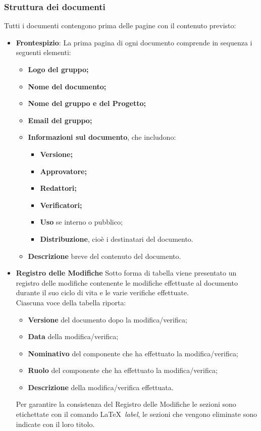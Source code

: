 \subsubsection{Struttura dei documenti}\label{StrutturaDocumenti}
Tutti i documenti contengono prima delle pagine con il contenuto previsto:
\begin{itemize}
\item \textbf{Frontespizio}:
La prima pagina di ogni documento comprende in sequenza i seguenti elementi:
\begin{itemize}
	\item \textbf{Logo del gruppo; }
	\item \textbf{Nome del documento;}
	\item \textbf{Nome del gruppo e del Progetto;}
	\item \textbf{Email del gruppo;}
	\item \textbf{Informazioni sul documento}, che includono:
		\begin{itemize}
			\item \textbf{Versione;}
			\item \textbf{Approvatore;}
			\item \textbf{Redattori;}
			\item \textbf{Verificatori;}
			\item \textbf{Uso} se interno o pubblico;
			\item \textbf{Distribuzione}, cioè i destinatari del documento.
		\end{itemize}
	\item \textbf{Descrizione} breve del contenuto del documento.
\end{itemize}

\item\textbf{Registro delle Modifiche}
Sotto forma di tabella viene presentato un registro delle modifiche contenente le modifiche effettuate al documento durante il suo ciclo di vita e le varie verifiche effettuate.\\
Ciascuna voce della tabella riporta:
\begin{itemize}
	\item \textbf{Versione} del documento dopo la modifica/verifica;
	\item \textbf{Data} della modifica/verifica;
	\item \textbf{Nominativo} del componente che ha effettuato la modifica/verifica;
	\item \textbf{Ruolo} del componente che ha effettuato la modifica/verifica;
	\item \textbf{Descrizione} della modifica/verifica effettuata.
\end{itemize}
Per garantire la consistenza del Registro delle Modifiche le sezioni sono etichettate con il comando \LaTeX\ \textit{label}, le sezioni che vengono eliminate sono indicate con il loro titolo.


\end{itemize}
